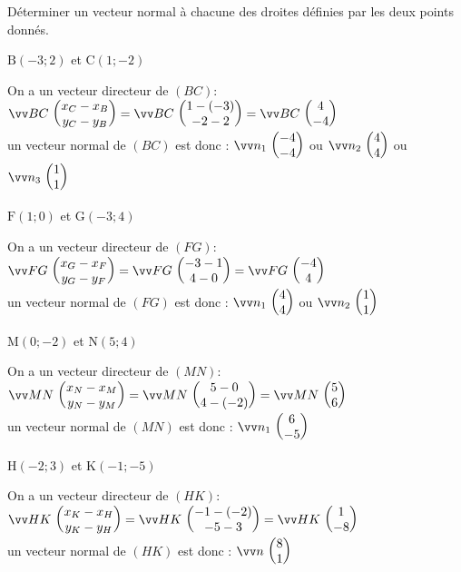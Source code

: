 \documentclass[11pt,a4paper]{article}  %
\begin{document}
\exerciceDS{}

Déterminer un vecteur normal à chacune des droites définies par les deux points donnés.
\begin{enumMet}
	\item $\mathrm{B}(-3 ; 2)$ et $\mathrm{C}(1 ;-2)$
	\begin{corrBox}
		On a un vecteur directeur de $(BC)$: $\Coord{BC}{x_C-x_B}{y_C-y_B}=\Coord{BC}{1-(-3)}{-2-2}=\Coord{BC}{4}{-4}$\\
		un vecteur normal de $(BC)$ est donc : $\Coord{n_1}{-4}{-4}$ ou $\Coord{n_2}{4}{4}$ ou $\Coord{n_3}{1}{1}$
	\end{corrBox}
	\item $\mathrm{F}(1 ; 0)$ et $\mathrm{G}(-3 ; 4)$
	\begin{corrBox}
		On a un vecteur directeur de $(FG)$: $\Coord{FG}{x_G-x_F}{y_G-y_F}=\Coord{FG}{-3-1}{4-0}=\Coord{FG}{-4}{4}$\\
		un vecteur normal de $(FG)$ est donc : $\Coord{n_1}{4}{4}$ ou $\Coord{n_2}{1}{1}$
	\end{corrBox}
	\item $\mathrm{M}(0 ;-2)$ et $\mathrm{N}(5 ; 4)$
	\begin{corrBox}
		On a un vecteur directeur de $(MN)$: $\Coord{MN}{x_N-x_M}{y_N-y_M}=\Coord{MN}{5-0}{4-(-2)}=\Coord{MN}{5}{6}$\\
		un vecteur normal de $(MN)$ est donc : $\Coord{n_1}{6}{-5}$
	\end{corrBox}
	\item $\mathrm{H}(-2 ; 3)$ et $\mathrm{K}(-1 ;-5)$
	\begin{corrBox}
		On a un vecteur directeur de $(HK)$: $\Coord{HK}{x_K-x_H}{y_K-y_H}=\Coord{HK}{-1-(-2)}{-5-3}=\Coord{HK}{1}{-8}$\\
		un vecteur normal de $(HK)$ est donc : $\Coord{n}{8}{1}$
	\end{corrBox}
\end{enumMet}

\exerciceDS{}
\end{document}
